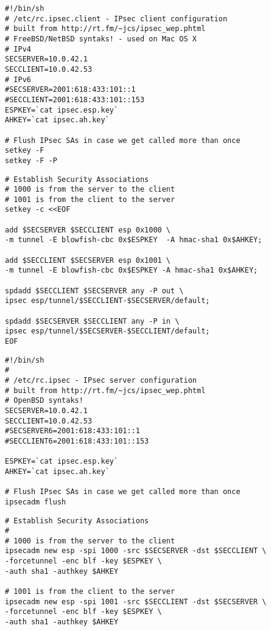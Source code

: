 
\begin{verbatim}
#!/bin/sh
# /etc/rc.ipsec.client - IPsec client configuration
# built from http://rt.fm/~jcs/ipsec_wep.phtml
# FreeBSD/NetBSD syntaks! - used on Mac OS X
# IPv4
SECSERVER=10.0.42.1
SECCLIENT=10.0.42.53
# IPv6
#SECSERVER=2001:618:433:101::1
#SECCLIENT=2001:618:433:101::153
ESPKEY=`cat ipsec.esp.key`
AHKEY=`cat ipsec.ah.key`

# Flush IPsec SAs in case we get called more than once
setkey -F
setkey -F -P
\end{verbatim}


\begin{verbatim}
# Establish Security Associations
# 1000 is from the server to the client
# 1001 is from the client to the server
setkey -c <<EOF

add $SECSERVER $SECCLIENT esp 0x1000 \
-m tunnel -E blowfish-cbc 0x$ESPKEY  -A hmac-sha1 0x$AHKEY;

add $SECCLIENT $SECSERVER esp 0x1001 \
-m tunnel -E blowfish-cbc 0x$ESPKEY -A hmac-sha1 0x$AHKEY;

spdadd $SECCLIENT $SECSERVER any -P out \
ipsec esp/tunnel/$SECCLIENT-$SECSERVER/default;

spdadd $SECSERVER $SECCLIENT any -P in \
ipsec esp/tunnel/$SECSERVER-$SECCLIENT/default;
EOF
\end{verbatim}


\begin{verbatim}
#!/bin/sh
#
# /etc/rc.ipsec - IPsec server configuration
# built from http://rt.fm/~jcs/ipsec_wep.phtml
# OpenBSD syntaks!
SECSERVER=10.0.42.1
SECCLIENT=10.0.42.53
#SECSERVER6=2001:618:433:101::1
#SECCLIENT6=2001:618:433:101::153

ESPKEY=`cat ipsec.esp.key`
AHKEY=`cat ipsec.ah.key`

# Flush IPsec SAs in case we get called more than once
ipsecadm flush
\end{verbatim}



\begin{verbatim}
# Establish Security Associations
#
# 1000 is from the server to the client
ipsecadm new esp -spi 1000 -src $SECSERVER -dst $SECCLIENT \
-forcetunnel -enc blf -key $ESPKEY \
-auth sha1 -authkey $AHKEY

# 1001 is from the client to the server
ipsecadm new esp -spi 1001 -src $SECCLIENT -dst $SECSERVER \
-forcetunnel -enc blf -key $ESPKEY \
-auth sha1 -authkey $AHKEY
\end{verbatim}


